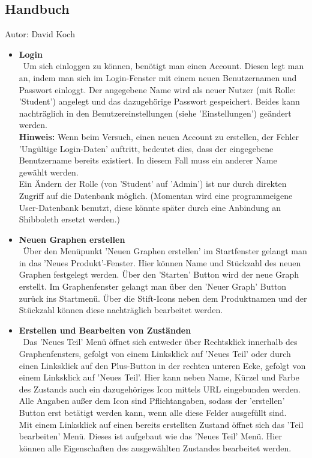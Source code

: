 \documentclass[twoside]{report}
\begin{document}
\subsection{Handbuch}
{\small Autor: David Koch}
\begin{itemize}
  \item \textbf{ Login }
    \\\
      Um sich einloggen zu können, benötigt man einen Account. Diesen legt man an, indem man sich im Login-Fenster mit einem neuen Benutzernamen und Passwort einloggt. Der angegebene Name wird als neuer Nutzer (mit Rolle: 'Student') angelegt und das dazugehörige Passwort gespeichert. Beides kann nachträglich in den Benutzereinstellungen (siehe 'Einstellungen') geändert werden.
      \\\textbf{Hinweis:} Wenn beim Versuch, einen neuen Account zu erstellen, der Fehler 'Ungültige Login-Daten' auftritt, bedeutet dies, dass der eingegebene Benutzername bereits existiert. In diesem Fall muss ein anderer Name gewählt werden.\\
      Ein Ändern der Rolle (von 'Student' auf 'Admin') ist nur durch direkten Zugriff auf die Datenbank möglich. (Momentan wird eine programmeigene User-Datenbank benutzt, diese könnte später durch eine Anbindung an Shibboleth ersetzt werden.)
  \item \textbf{ Neuen Graphen erstellen }
    \\\
      Über den Menüpunkt 'Neuen Graphen erstellen' im Startfenster gelangt man in das 'Neues Produkt'-Fenster. Hier können Name und Stückzahl des neuen Graphen festgelegt werden. Über den 'Starten'  Button wird der neue Graph erstellt. Im Graphenfenster gelangt man über den 'Neuer Graph' Button zurück ins Startmenü. Über die Stift-Icons neben dem Produktnamen und der Stückzahl können diese nachträglich bearbeitet werden.
  \item \textbf{ Erstellen und Bearbeiten von Zuständen }
    \\\
      Das 'Neues Teil' Menü öffnet sich entweder über Rechtsklick innerhalb des Graphenfensters, gefolgt von einem Linksklick auf 'Neues Teil' oder durch einen Linksklick auf den Plus-Button in der rechten unteren Ecke, gefolgt von einem Linksklick auf 'Neues Teil'. Hier kann neben Name, Kürzel und Farbe des Zustands auch ein dazugehöriges Icon mittels URL eingebunden werden. Alle Angaben außer dem Icon sind Pflichtangaben, sodass der 'erstellen' Button erst betätigt werden kann, wenn alle diese Felder ausgefüllt sind.\\
      Mit einem Linksklick auf einen bereits erstellten Zustand öffnet sich das 'Teil bearbeiten' Menü. Dieses ist aufgebaut wie das 'Neues Teil' Menü. Hier können alle Eigenschaften des ausgewählten Zustandes bearbeitet werden.

\end{itemize}
\end{document}
